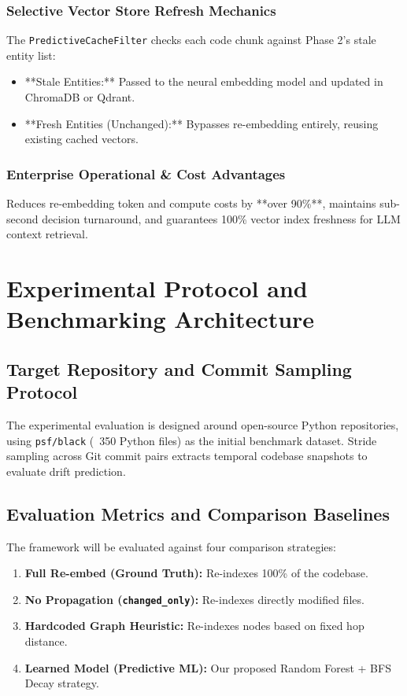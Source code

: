 \documentclass[conference]{IEEEtran}
\begin{document}
\subsubsection{Selective Vector Store Refresh Mechanics}
The \texttt{PredictiveCacheFilter} checks each code chunk against Phase 2's stale entity list:
\begin{itemize}
    \item **Stale Entities:** Passed to the neural embedding model and updated in ChromaDB or Qdrant.
    \item **Fresh Entities (Unchanged):** Bypasses re-embedding entirely, reusing existing cached vectors.
\end{itemize}

\subsubsection{Enterprise Operational \& Cost Advantages}
Reduces re-embedding token and compute costs by **over 90\%**, maintains sub-second decision turnaround, and guarantees 100\% vector index freshness for LLM context retrieval.

\section{Experimental Protocol and Benchmarking Architecture}

\subsection{Target Repository and Commit Sampling Protocol}
The experimental evaluation is designed around open-source Python repositories, using \texttt{psf/black} (~350 Python files) as the initial benchmark dataset. Stride sampling across Git commit pairs extracts temporal codebase snapshots to evaluate drift prediction.

\subsection{Evaluation Metrics and Comparison Baselines}
The framework will be evaluated against four comparison strategies:
\begin{enumerate}
    \item \textbf{Full Re-embed (Ground Truth):} Re-indexes 100\% of the codebase.
    \item \textbf{No Propagation (\texttt{changed\_only}):} Re-indexes directly modified files.
    \item \textbf{Hardcoded Graph Heuristic:} Re-indexes nodes based on fixed hop distance.
    \item \textbf{Learned Model (Predictive ML):} Our proposed Random Forest + BFS Decay strategy.
\end{enumerate}
\end{document}
